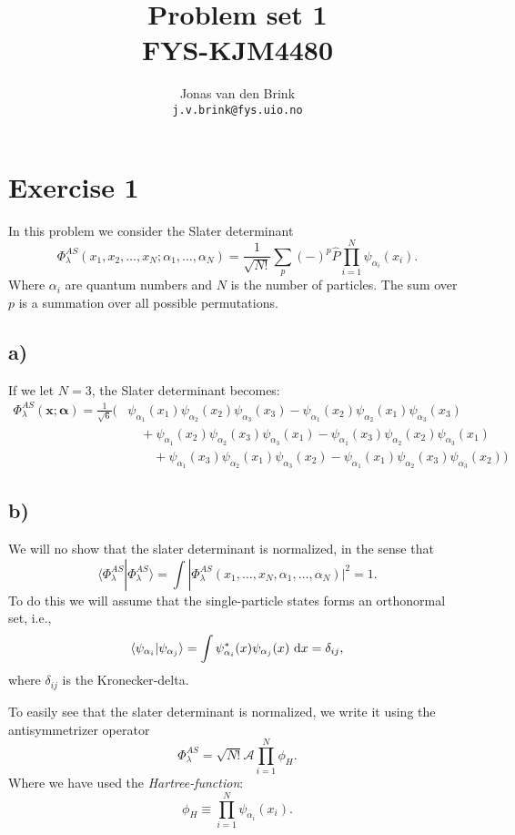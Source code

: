 \documentclass[a4paper, 11pt, notitlepage, english]{article}
\author{Jonas van den Brink \\ \texttt{j.v.brink@fys.uio.no}}
\title{Problem set 1 \\ FYS-KJM4480}
\newcommand{\braket}[2]{\langle #1 | #2 \rangle}
\newcommand{\op}[1]{\hat{#1}}
\renewcommand{\d}{{\rm d}}
\newcommand{\bt}[1]{\boldsymbol{#1}}
\begin{document}
\maketitle

\section*{Exercise 1}

In this problem we consider the Slater determinant
$$\Phi_\lambda^{AS} (x_1, x_2, \ldots, x_N; \alpha_1, \ldots, \alpha_N) = \frac{1}{\sqrt{N!}}\sum_p (-)^p \op{P} \prod_{i=1}^N \psi_{\alpha_i}(x_i).$$
Where $\alpha_i$ are quantum numbers and $N$ is the number of particles. The sum over $p$ is a summation over all possible permutations.

\subsection*{a)}
If we let $N=3$, the Slater determinant becomes:
\begin{align*}   
\Phi_\lambda^{AS}(\bt{x};\bt{\alpha}) = \frac{1}{\sqrt{6}} \bigg(
&\psi_{\alpha_1}(x_1) \psi_{\alpha_2} (x_2)\psi_{\alpha_3}(x_3)
- \psi_{\alpha_1}(x_2) \psi_{\alpha_2} (x_1)\psi_{\alpha_3}(x_3) \\
&\quad+ \psi_{\alpha_1}(x_2) \psi_{\alpha_2} (x_3)\psi_{\alpha_3}(x_1)  
- \psi_{\alpha_1}(x_3) \psi_{\alpha_2} (x_2)\psi_{\alpha_3}(x_1) \\
&\qquad+ \psi_{\alpha_1}(x_3) \psi_{\alpha_2} (x_1)\psi_{\alpha_3}(x_2) 
- \psi_{\alpha_1}(x_1) \psi_{\alpha_2} (x_3)\psi_{\alpha_3}(x_2)\bigg)
\end{align*}

\subsection*{b)}
We will no show that the slater determinant is normalized, in the sense that
$$\braket{\Phi_\lambda^{AS}}{\Phi_\lambda^{AS}} = \int |\Phi_\lambda^{AS} (x_1,\ldots, x_N, \alpha_1, \ldots, \alpha_N)|^2 = 1.$$
To do this we will assume that the single-particle states forms an orthonormal set, i.e.,
$$\braket{\psi_{\alpha_i}}{\psi_{\alpha_j}} = \int \psi^*_{\alpha_i}(x)\psi_{\alpha_j}(x) \ \d x = \delta_{ij},$$
where $\delta_{ij}$ is the Kronecker-delta.

To easily see that the slater determinant is normalized, we write it using the antisymmetrizer operator
$$\Phi_\lambda^{AS} = \sqrt{N!}\mathcal{A}\prod_{i=1}^N \phi_H.$$
Where we have used the \emph{Hartree-function}:
$$\phi_H \equiv \prod_{i=1}^N \psi_{\alpha_i}(x_i).$$
\end{document}
